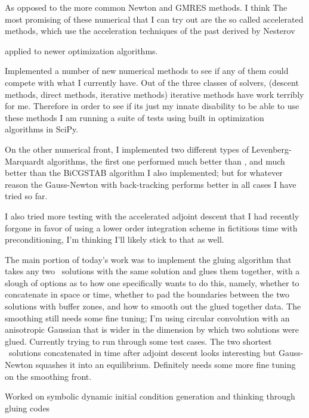As opposed to the more common Newton and GMRES methods. I think
The most promising of these numerical that I can try out are the
so called accelerated methods, which use the acceleration techniques
of the past derived by Nesterov

applied to newer optimization algorithms.

Implemented a number of new numerical methods to see if any of them could
compete with what I currently have. Out of the three classes of solvers,
(descent methods, direct methods, iterative methods) iterative methods
have work terribly for me. Therefore in order to see if its just my innate
disability to be able to use these methods I am running a suite of tests
using built in optimization algorithms in SciPy.

On the other numerical front, I implemented two different types of Levenberg-Marquardt
algorithms, the first one performed much better than ,
and much better than the BiCGSTAB algorithm I also implemented; but for whatever
reason the Gauss-Newton with back-tracking performs better in all cases I have tried
so far.

I also tried more testing with the accelerated adjoint descent that I had recently forgone
in favor of using a lower order integration scheme in fictitious time with preconditioning,
I'm thinking I'll likely stick to that as well.

The main portion of today's work was to implement the gluing algorithm that takes any
two \twot\ solutions with the same solution and glues them together, with a slough of
options as to how one specifically wants to do this, namely, whether to concatenate in
space or time, whether to pad the boundaries between the two solutions with buffer
zones, and how to smooth out the glued together data. The smoothing still needs some fine
tuning; I'm using circular convolution with an anisotropic Gaussian that is wider in the
dimension by which two solutions were glued. Currently trying to run through some test
cases. The two shortest \ppo\ solutions concatenated in time after adjoint descent
looks interesting but Gauss-Newton squashes it into an equilibrium. Definitely needs
some more fine tuning on the smoothing front.

Worked on symbolic dynamic initial condition
generation and thinking through gluing codes

